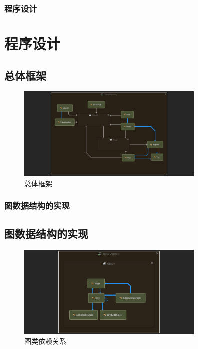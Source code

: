 \documentclass{beamer}
\begin{document}
\begin{frame}
\frametitle{程序设计}
\section{程序设计}
\subsection{总体框架}
\begin{figure}[H]
\centering
\includegraphics[width=0.8\textwidth]{8.png}
\caption{总体框架} 
\end{figure}
\end{frame}

\begin{frame}
\frametitle{图数据结构的实现}
\subsection{图数据结构的实现}
\begin{figure}[H]
\centering
\includegraphics[width=0.8\textwidth]{6.png}
\caption{图类依赖关系} 
\end{figure}
\end{frame}
\end{document}

